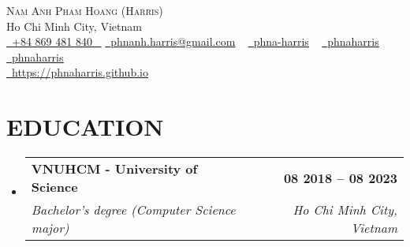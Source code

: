 \documentclass[letterpaper,11pt]{article}
\makeatletter
\newcommand{\resumeSubheading}[4]{
  \vspace{-2pt}\item
    \begin{tabular*}{1.0\textwidth}[t]{l@{\extracolsep{\fill}}r}
      \textbf{\large#1} & \textbf{\small #2} \\
      \textit{\large#3} & \textit{\small #4} \\
      
    \end{tabular*}\vspace{-7pt}
}
\newcommand{\resumeSubHeadingListStart}{\begin{itemize}[leftmargin=0.0in, label={}]}
\newcommand{\resumeSubHeadingListEnd}{\end{itemize}}
\makeatother
\begin{document}

\begin{center}
    {\Huge \scshape Nam Anh Pham Hoang (Harris)} \\ \vspace{1pt}
    Ho Chi Minh City, Vietnam \\ \vspace{1pt}
    \small \href{tel:+84 869 481 840}{ \raisebox{-0.1\height}\faPhone\ \underline{+84 869 481 840} ~}
    \href{mailto:phnanh.harris@gmail.com}{\raisebox{-0.2\height}\faEnvelope\  \underline{phnanh.harris@gmail.com}} ~ 
    \href{https://linkedin.com/in/phnaharris}{\raisebox{-0.2\height}\faLinkedinSquare\ \underline{phna-harris}}  ~
    \href{https://github.com/phnaharris}{\raisebox{-0.2\height}\faGithub\ \underline{phnaharris}} ~
    \href{https://www.hackerrank.com/phnaharris}{\raisebox{-0.2\height}\faHackerrank\ \underline{phnaharris}} \\
    \href{https://phnaharris.github.io}{\raisebox{-0.2\height}\faGlobe\  \underline{https://phnaharris.github.io}} ~
    \vspace{-8pt}
\end{center}


\section{EDUCATION}
  \resumeSubHeadingListStart
    \resumeSubheading
      {VNUHCM - University of Science}{08 2018 -- 08 2023}
      {Bachelor's degree (Computer Science major)}{Ho Chi Minh City, Vietnam}
  \resumeSubHeadingListEnd
  

\end{document}
